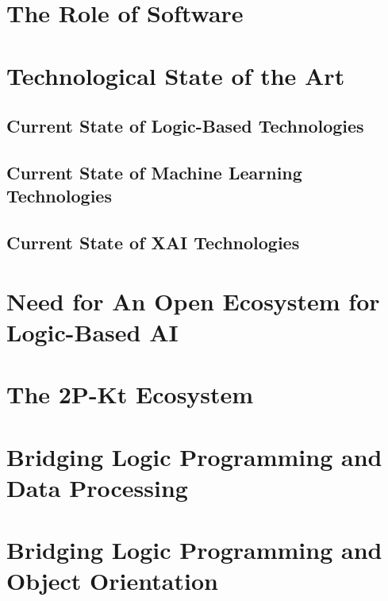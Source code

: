 \documentclass[12pt,a4paper,openright,twoside]{book}
\begin{document}
\chapter{The Role of Software}

\chapter{Technological State of the Art}

\cite{coordination-jlamp2020}

\section{Current State of Logic-Based Technologies}

\cite{lptech4mas-aamas2021}
\cite{lptech4mas-jaamas35}
\cite{logictech-information11}

\section{Current State of Machine Learning Technologies}

\section{Current State of XAI Technologies}

\cite{xaisurvey-ia14}

\chapter{Need for An Open Ecosystem for Logic-Based AI}

\cite{cco-softwarex-2021-2pkt}

\chapter{The 2P-Kt Ecosystem}

\cite{cco-softwarex-2021-2pkt}
\cite{kotlindsi4prolog-woa2020}

\chapter{Bridging Logic Programming and Data Processing}

\cite{2pkt-jelia2021}

\chapter{Bridging Logic Programming and Object Orientation}
\end{document}
